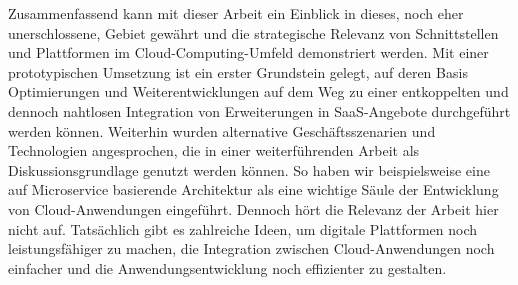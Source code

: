 Zusammenfassend kann mit dieser Arbeit ein Einblick in dieses, noch eher unerschlossene, Gebiet gewährt und die strategische Relevanz von Schnittstellen und Plattformen im Cloud-Computing-Umfeld demonstriert werden. Mit einer prototypischen Umsetzung ist ein erster Grundstein gelegt, auf deren Basis Optimierungen und Weiterentwicklungen auf dem Weg zu einer entkoppelten und dennoch nahtlosen Integration von Erweiterungen in \ac{SaaS}-Angebote durchgeführt werden können. Weiterhin wurden alternative Geschäftsszenarien und Technologien angesprochen, die in einer weiterführenden Arbeit als Diskussionsgrundlage genutzt werden können. So haben wir beispielsweise eine auf Microservice basierende Architektur als eine wichtige Säule der Entwicklung von Cloud-Anwendungen eingeführt. Dennoch hört die Relevanz der Arbeit hier nicht auf. Tatsächlich gibt es zahlreiche Ideen, um digitale Plattformen noch leistungsfähiger zu machen, die Integration zwischen Cloud-Anwendungen noch einfacher und die Anwendungsentwicklung noch effizienter zu gestalten.